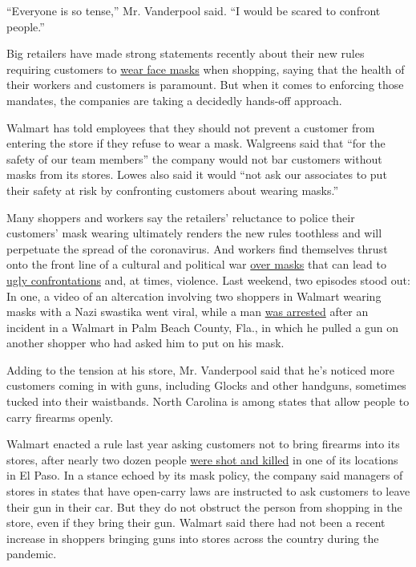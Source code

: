 ``Everyone is so tense,'' Mr. Vanderpool said. ``I would be scared to
confront people.''

Big retailers have made strong statements recently about their new rules
requiring customers to
\href{https://www.nytimes.com/article/which-stores-require-masks.html?searchResultPosition=3}{wear
face masks} when shopping, saying that the health of their workers and
customers is paramount. But when it comes to enforcing those mandates,
the companies are taking a decidedly hands-off approach.

Walmart has told employees that they should not prevent a customer from
entering the store if they refuse to wear a mask. Walgreens said that
``for the safety of our team members'' the company would not bar
customers without masks from its stores. Lowes also said it would ``not
ask our associates to put their safety at risk by confronting customers
about wearing masks.''

Many shoppers and workers say the retailers' reluctance to police their
customers' mask wearing ultimately renders the new rules toothless and
will perpetuate the spread of the coronavirus. And workers find
themselves thrust onto the front line of a cultural and political war
\href{https://www.nytimes.com/2020/05/03/us/coronavirus-masks-protests.html}{over
masks} that can lead to
\href{https://www.nytimes.com/2020/05/15/us/coronavirus-masks-violence.html?searchResultPosition=105}{ugly
confrontations} and, at times, violence. Last weekend, two episodes
stood out: In one, a video of an altercation involving two shoppers in
Walmart wearing masks with a Nazi swastika went viral, while a man
\href{https://www.facebook.com/palmbeachcountysheriff/}{was arrested}
after an incident in a Walmart in Palm Beach County, Fla., in which he
pulled a gun on another shopper who had asked him to put on his mask.

Adding to the tension at his store, Mr. Vanderpool said that he's
noticed more customers coming in with guns, including Glocks and other
handguns, sometimes tucked into their waistbands. North Carolina is
among states that allow people to carry firearms openly.

Walmart enacted a rule last year asking customers not to bring firearms
into its stores, after nearly two dozen people
\href{https://www.nytimes.com/2019/08/03/us/el-paso-shooting.html}{were
shot and killed} in one of its locations in El Paso. In a stance echoed
by its mask policy, the company said managers of stores in states that
have open-carry laws are instructed to ask customers to leave their gun
in their car. But they do not obstruct the person from shopping in the
store, even if they bring their gun. Walmart said there had not been a
recent increase in shoppers bringing guns into stores across the country
during the pandemic.

